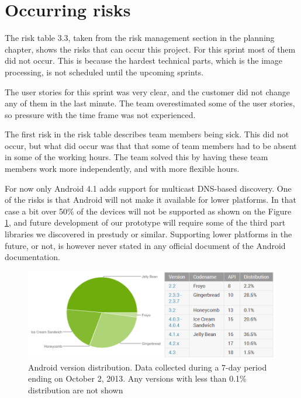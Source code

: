 \section{Occurring risks}
The risk table 3.3, taken from the risk management section in the planning chapter, shows the risks that can occur this project. 
For this sprint most of them did not occur. 
This is because the hardest technical parts, which is the image processing, is not scheduled until the upcoming sprints. 

The user stories for this sprint was very clear, and the customer did not change any of them in the last minute. The team overestimated some of the user stories, so pressure with the time frame was not experienced.

The first risk in the risk table describes team members being sick. This did not occur, but what did occur was that that some of team members had to be absent in some of the working hours. 
The team solved this by having these team members work more independently, and with more flexible hours.  

For now only Android 4.1 adds support for multicast DNS-based discovery.
One of the risks is that Android will not make it available for lower platforms.
In that case a bit over 50\% of the devices will not be supported as shown on the Figure \ref{fig:Platform_chart }, and future development of our prototype will require some of the third part libraries we discovered in prestudy or similar.
Supporting lower platforms in the future, or not, is however never stated in any official document of the Android documentation.

\begin{figure}[H]
	\centering
		\includegraphics[width=16cm]{sprint1/android_platform_chart.png}
	\caption[Android version distribution]{Android version distribution\footnotemark. Data collected during a 7-day period ending on October 2, 2013. 
	Any versions with less than 0.1\% distribution are not shown}
	\label{fig:Platform_chart }
\end{figure}

